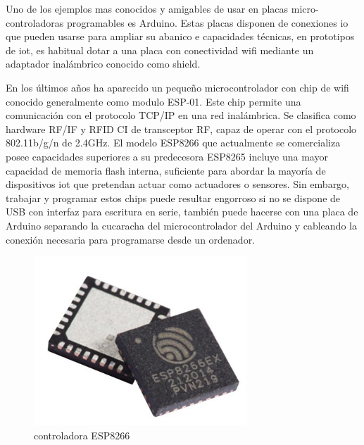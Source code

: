 \vspace{1cm}


Uno de los ejemplos mas conocidos y amigables de usar en placas micro-controladoras programables es Arduino. Estas placas disponen de conexiones \gls{io} que pueden usarse para ampliar su abanico e capacidades técnicas, en prototipos de \gls{iot}, es habitual dotar a una placa con conectividad \gls{wifi} mediante un adaptador inalámbrico conocido como shield.

\vspace{1cm}

En los últimos años ha aparecido un pequeño microcontrolador con chip de \gls{wifi} conocido generalmente como modulo ESP-01. Este chip permite una comunicación con el protocolo TCP/IP en una red inalámbrica. Se clasifica como hardware RF/IF y RFID CI de transceptor RF, capaz de operar con el protocolo 802.11b/g/n de 2.4GHz. El modelo ESP8266 que actualmente se comercializa posee capacidades superiores a su predecesora ESP8265 incluye una mayor capacidad de memoria flash interna, suficiente para abordar la mayoría de dispositivos \gls{iot} que pretendan actuar como actuadores o sensores.
Sin embargo, trabajar y programar estos chips puede resultar engorroso si no se dispone de USB con interfaz para escritura en serie, también puede hacerse con una placa de Arduino separando la cucaracha del microcontrolador del Arduino y cableando la conexión necesaria para programarse desde un ordenador.

\begin{figure}[hbt!]
\centering
\includegraphics[height=2.5in]{figures/esp8266ex.jpg}
\caption[controladora ESP8233]{controladora ESP8266\footnotemark}
\end{figure}

\vspace{1cm}

